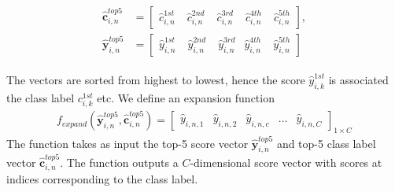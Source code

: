 \begin{align}
\begin{split}
\bm{\hat{c}}_{i,n}^{top5} &= \begin{bmatrix}
\hat{c}_{i,n}^{1st} & \phantom{.}\hat{c}_{i,n}^{2nd} & \phantom{.}\hat{c}_{i,n}^{3rd} & \phantom{.}\hat{c}_{i,n}^{4th} & \phantom{.}\hat{c}_{i,n}^{5th}
\end{bmatrix}, \\
\bm{\hat{y}}^{top5}_{i,n} &= \begin{bmatrix}
\hat{y}_{i,n}^{1st} & \phantom{.}\hat{y}_{i,n}^{2nd} & \phantom{.}\hat{y}_{i,n}^{3rd} & \hat{y}_{i,n}^{4th} & \phantom{.}\hat{y}_{i,n}^{5th}
\end{bmatrix}
\end{split}
\end{align}

The vectors are sorted from highest to lowest, hence the score $ \hat{y}_{i,k}^{1st} $ is associated the class label $ c_{i,k}^{1st} $ etc. 
We define an expansion function 
\begin{align}
f_{expand}\left(\bm{\hat{y}}_{i,n}^{top5},\bm{\hat{c}}_{i,n}^{top5}\right) = 
\begin{bmatrix}
\hat{y}_{i,n,1} & \hat{y}_{i,n,2} & \hat{y}_{i,n,c} & \dots & \hat{y}_{i,n,C}
\end{bmatrix}_{1 \times C}
\end{align}
The function takes as input the top-5 score vector $ \bm{\hat{y}}_{i,n}^{top5}$ and top-5 class label vector  $\bm{\hat{c}}_{i,n}^{top5}$. The function outputs a $ C $-dimensional score vector with scores at indices corresponding to the class label. 

